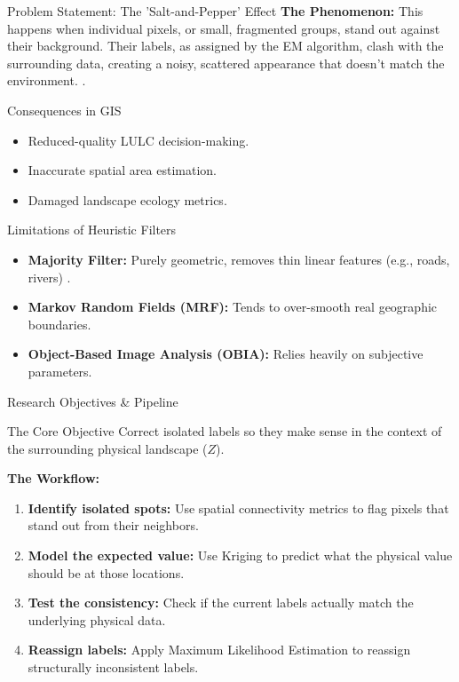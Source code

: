 \documentclass[10pt, aspectratio=169]{beamer}
\begin{document}
\begin{frame}{Problem Statement: The 'Salt-and-Pepper' Effect}
    \textbf{The Phenomenon:} This happens when individual pixels, or small, fragmented groups, stand out against their background. Their labels, as assigned by the EM algorithm, clash with the surrounding data, creating a noisy, scattered appearance that doesn't match the environment. \cite{besag1986statistical}.


    \vspace{0.3cm}
    \begin{block}{Consequences in GIS}
        \begin{itemize}
            \item Reduced-quality LULC decision-making.
            \item Inaccurate spatial area estimation.
            \item Damaged landscape ecology metrics.
        \end{itemize}
    \end{block}

    \begin{block}{Limitations of Heuristic Filters}
        \begin{itemize}
            \item \textbf{Majority Filter:} Purely geometric, removes thin linear features (e.g., roads, rivers) \cite{kim1996adaptive}.
            \item \textbf{Markov Random Fields (MRF):} Tends to over-smooth real geographic boundaries.
            \item \textbf{ Object-Based Image Analysis (OBIA):} Relies heavily on subjective parameters.
        \end{itemize}
    \end{block}
\end{frame}

\begin{frame}{Research Objectives \& Pipeline}
    \begin{alertblock}{The Core Objective}
        Correct isolated labels so they make sense in the context of the surrounding physical landscape ($Z$).
    \end{alertblock}

    \vspace{0.3cm}
    \textbf{The Workflow:}
    \begin{enumerate}
        \item \textbf{Identify isolated spots:} Use spatial connectivity metrics to flag pixels that stand out from their neighbors.
        \item \textbf{Model the expected value:} Use Kriging to predict what the physical value should be at those locations.
        \item \textbf{Test the consistency:} Check if the current labels actually match the underlying physical data.
        \item \textbf{Reassign labels:} Apply Maximum Likelihood Estimation to reassign structurally inconsistent labels.
    \end{enumerate}
\end{frame}
\end{document}

